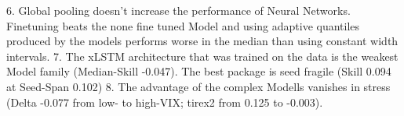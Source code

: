 6. Global pooling doesn't increase the performance of Neural Networks. Finetuning beats the none fine tuned Model and using adaptive quantiles produced by the models performs worse in the median than using constant width intervals.
7. The xLSTM architecture that was trained on the data is the weakest Model family (Median-Skill -0.047). The best package is seed fragile (Skill 0.094 at Seed-Span 0.102)
8. The advantage of the complex Modells vanishes in stress (Delta -0.077 from low- to high-VIX; tirex2 from 0.125 to -0.003).
%
%


%
